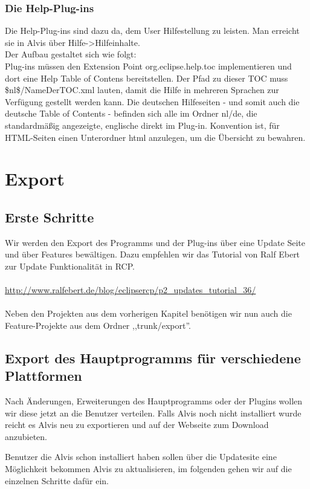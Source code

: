 \documentclass[10pt,a4paper,oneside]{scrbook}
\begin{document}
\subsection{Die Help-Plug-ins}
Die Help-Plug-ins sind dazu da, dem User Hilfestellung zu leisten. Man erreicht sie in Alvis über Hilfe->Hilfeinhalte.\\
Der Aufbau gestaltet sich wie folgt:\\
Plug-ins müssen den Extension Point org.eclipse.help.toc implementieren und dort eine Help Table of Contens bereitstellen.
Der Pfad zu dieser TOC muss \$nl\$/NameDerTOC.xml lauten, damit die Hilfe in mehreren Sprachen zur Verfügung gestellt werden kann.
Die deutschen Hilfeseiten - und somit auch die deutsche Table of Contents - befinden sich alle im Ordner nl/de, die 
standardmäßig angezeigte, englische direkt im Plug-in. Konvention ist, für HTML-Seiten einen Unterordner html anzulegen,
um die Übersicht zu bewahren.

\newpage
\chapter{Export}
\section{Erste Schritte}
Wir werden den Export des Programms und der Plug-ins über eine Update Seite und über Features bewältigen. Dazu empfehlen wir das Tutorial von Ralf Ebert zur Update Funktionalität in RCP.
\\ \\
\url{http://www.ralfebert.de/blog/eclipsercp/p2\_updates\_tutorial\_36/}
\\ \\
Neben den Projekten aus dem vorherigen Kapitel benötigen wir nun auch die Feature-Projekte aus dem Ordner ,,trunk/export''.

\section{Export des Hauptprogramms für verschiedene Plattformen}
Nach Änderungen, Erweiterungen des Hauptprogramms oder der Plugins wollen wir diese jetzt an die Benutzer verteilen. Falls Alvis noch nicht installiert wurde reicht es Alvis neu zu exportieren und auf der Webseite zum Download anzubieten.

Benutzer die Alvis schon installiert haben sollen über die Updatesite eine Möglichkeit  bekommen Alvis zu aktualisieren, im folgenden gehen wir auf die einzelnen Schritte dafür ein.
\end{document}
